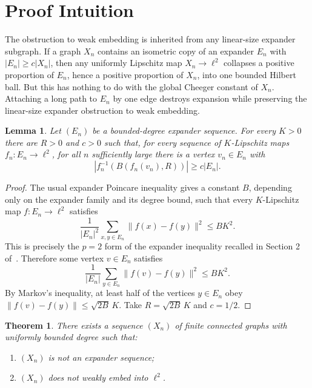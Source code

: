 \documentclass[11pt]{article}
\newtheorem{theorem}{Theorem}
\newtheorem{lemma}{Lemma}
\begin{document}
\section*{Proof Intuition}

The obstruction to weak embedding is inherited from any linear-size expander
subgraph.  If a graph \(X_n\) contains an isometric copy of an expander
\(E_n\) with \(|E_n|\ge c|X_n|\), then any uniformly Lipschitz map
\(X_n\to\ell^2\) collapses a positive proportion of \(E_n\), hence a positive
proportion of \(X_n\), into one bounded Hilbert ball.  But this has nothing to
do with the global Cheeger constant of \(X_n\).  Attaching a long path to
\(E_n\) by one edge destroys expansion while preserving the linear-size
expander obstruction to weak embedding.

\begin{lemma}\label{lem:collapse}
Let \((E_n)\) be a bounded-degree expander sequence.  For every \(K>0\) there
are \(R>0\) and \(c>0\) such that, for every sequence of \(K\)-Lipschitz maps
\(f_n:E_n\to\ell^2\), for all \(n\) sufficiently large there is a vertex
\(v_n\in E_n\) with
\[
  |f_n^{-1}(B(f_n(v_n),R))|\ge c|E_n|.
\]
\end{lemma}

\begin{proof}
The usual expander Poincare inequality gives a constant \(B\), depending only
on the expander family and its degree bound, such that every \(K\)-Lipschitz
map \(f:E_n\to\ell^2\) satisfies
\[
  \frac{1}{|E_n|^2}\sum_{x,y\in E_n}\|f(x)-f(y)\|^2 \le B K^2 .
\]
This is precisely the \(p=2\) form of the expander inequality recalled in
Section 2 of~\cite{AT}.  Therefore some vertex \(v\in E_n\) satisfies
\[
  \frac{1}{|E_n|}\sum_{y\in E_n}\|f(v)-f(y)\|^2 \le B K^2 .
\]
By Markov's inequality, at least half of the vertices \(y\in E_n\) obey
\(\|f(v)-f(y)\|\le \sqrt{2B}\,K\).  Take \(R=\sqrt{2B}\,K\) and \(c=1/2\).
\end{proof}

\begin{theorem}
There exists a sequence \((X_n)\) of finite connected graphs with uniformly
bounded degree such that:
\begin{enumerate}
  \item \((X_n)\) is not an expander sequence;
  \item \((X_n)\) does not weakly embed into \(\ell^2\).
\end{enumerate}
\end{theorem}
\end{document}
